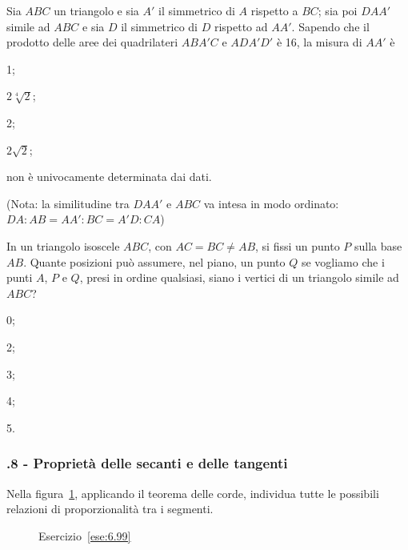 \begin{esercizio}
\label{ese:6.97}
Sia $ABC$ un triangolo e sia $A'$ il simmetrico di $A$ rispetto a $BC$; sia poi $DAA'$ simile ad $ABC$ e sia $D$ il simmetrico di $D$ rispetto ad $AA'$. Sapendo che il prodotto delle aree dei quadrilateri $ABA'C$ e $ADA'D'$ è 16, la misura di $AA'$ è
\begin{enumeratea}
\item 1;
\item $2\sqrt[4]{2}$;
\item 2;
\item $2\sqrt{2}$;
\item non è univocamente determinata dai dati.
\end{enumeratea}
(Nota: la similitudine tra $DAA'$ e $ABC$ va intesa in modo ordinato: $DA : AB = AA':BC=A'D:CA$)
\end{esercizio}

\begin{esercizio}
\label{ese:6.98}
In un triangolo isoscele $ABC$, con $AC = BC \neq AB$, si fissi un punto $P$ sulla base $AB$. Quante posizioni può assumere, nel piano, un punto $Q$ se vogliamo che i punti $A$, $P$ e $Q$, presi in ordine qualsiasi, siano i vertici di un triangolo simile ad $ABC$?
\begin{multicols}{5}
\begin{enumeratea}
\item 0;
\item 2;
\item 3;
\item 4;
\item 5.
\end{enumeratea}
\end{multicols}
\end{esercizio}
 
\subsubsection*{\thechapter.8 - Proprietà delle secanti e delle tangenti}

\begin{esercizio}
\label{ese:6.99}
Nella figura~\ref{fig:ese6.99}, applicando il teorema delle corde, individua tutte le possibili relazioni di proporzionalità tra i segmenti.
\end{esercizio}

\begin{figure}[!htb]
	\centering
	\caption{Esercizio~\ref{ese:6.99}}\label{fig:ese6.99}
\end{figure}

